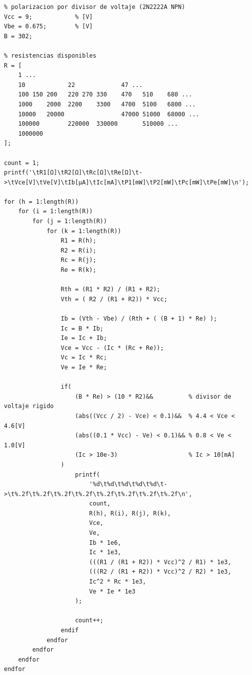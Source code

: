 \scriptsize
\begin{shaded}
\begin{verbatim}
% polarizacion por divisor de voltaje (2N2222A NPN)
Vcc = 9;            % [V]
Vbe = 0.675;        % [V]
B = 302;

% resistencias disponibles
R = [
    1 ...
    10            22             47 ...
    100 150 200   220 270 330    470   510    680 ...
    1000    2000  2200    3300   4700  5100   6800 ...
    10000   20000                47000 51000  68000 ...
    100000        220000  330000       510000 ...
    1000000
];

count = 1;
printf('\tR1[Ω]\tR2[Ω]\tRc[Ω]\tRe[Ω]\t->\tVce[V]\tVe[V]\tIb[µA]\tIc[mA]\tP1[mW]\tP2[mW]\tPc[mW]\tPe[mW]\n');

for (h = 1:length(R))
    for (i = 1:length(R))
        for (j = 1:length(R))
            for (k = 1:length(R))
                R1 = R(h);
                R2 = R(i);
                Rc = R(j);
                Re = R(k);

                Rth = (R1 * R2) / (R1 + R2);
                Vth = ( R2 / (R1 + R2)) * Vcc;

                Ib = (Vth - Vbe) / (Rth + ( (B + 1) * Re) );
                Ic = B * Ib;
                Ie = Ic + Ib;
                Vce = Vcc - (Ic * (Rc + Re));
                Vc = Ic * Rc;
                Ve = Ie * Re;

                if(
                    (B * Re) > (10 * R2)&&          % divisor de voltaje rigido
                    (abs((Vcc / 2) - Vce) < 0.1)&&  % 4.4 < Vce < 4.6[V]
                    (abs((0.1 * Vcc) - Ve) < 0.1)&& % 0.8 < Ve < 1.0[V]
                    (Ic > 10e-3)                    % Ic > 10[mA]
                )
                    printf(
                        '%d\t%d\t%d\t%d\t%d\t->\t%.2f\t%.2f\t%.2f\t%.2f\t%.2f\t%.2f\t%.2f\t%.2f\n',
                        count,
                        R(h), R(i), R(j), R(k),
                        Vce,
                        Ve,
                        Ib * 1e6,
                        Ic * 1e3,
                        (((R1 / (R1 + R2)) * Vcc)^2 / R1) * 1e3,
                        (((R2 / (R1 + R2)) * Vcc)^2 / R2) * 1e3,
                        Ic^2 * Rc * 1e3,
                        Ve * Ie * 1e3
                    );

                    count++;
                endif
            endfor
        endfor
    endfor
endfor
\end{verbatim}
\end{shaded}
\normalsize

